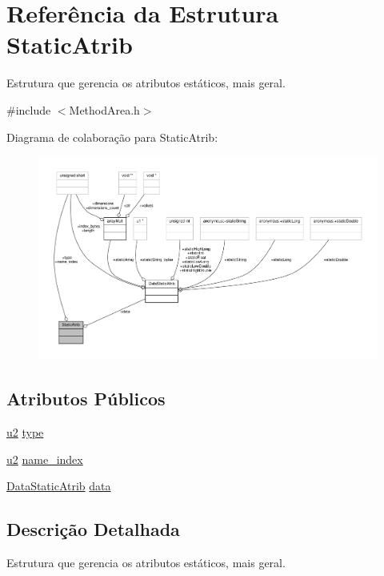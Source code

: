 \hypertarget{structStaticAtrib}{}\section{Referência da Estrutura Static\+Atrib}
\label{structStaticAtrib}


Estrutura que gerencia os atributos estáticos, mais geral.  




{\ttfamily \#include $<$Method\+Area.\+h$>$}



Diagrama de colaboração para Static\+Atrib\+:\nopagebreak
\begin{figure}[H]
\begin{center}
\leavevmode
\includegraphics[width=350pt]{structStaticAtrib__coll__graph}
\end{center}
\end{figure}
\subsection*{Atributos Públicos}
\begin{DoxyCompactItemize}
\item 
\hyperlink{ClassLoader_8h_a5f223212eef04d10a4550ded680cb1cf}{u2} \hyperlink{structStaticAtrib_ace3f941daa9df10a76029562b3f9cef3}{type}
\item 
\hyperlink{ClassLoader_8h_a5f223212eef04d10a4550ded680cb1cf}{u2} \hyperlink{structStaticAtrib_a7066a25332e32a5d8eccc92d8b303635}{name\+\_\+index}
\item 
\hyperlink{unionDataStaticAtrib}{Data\+Static\+Atrib} \hyperlink{structStaticAtrib_aa9c612ef7f4696833d6658c21691b048}{data}
\end{DoxyCompactItemize}


\subsection{Descrição Detalhada}
Estrutura que gerencia os atributos estáticos, mais geral. 

